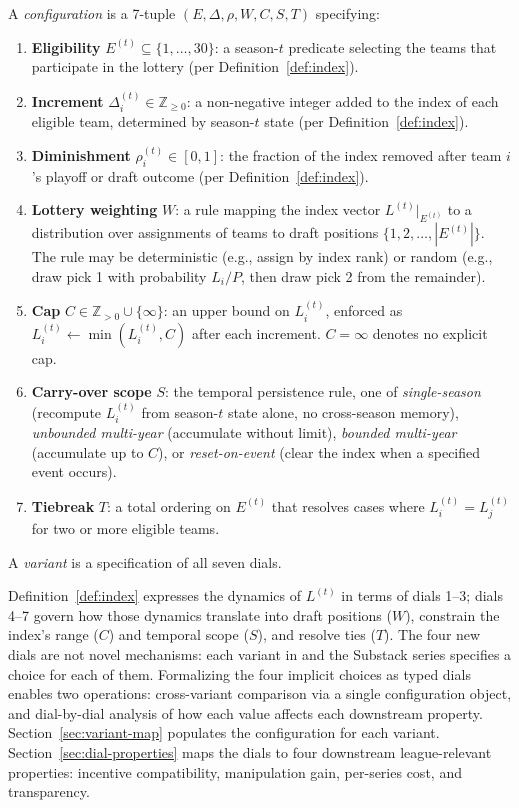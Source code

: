 \begin{definition}
\label{def:configuration}
A \cola{} \emph{configuration} is a 7-tuple $(E, \Delta, \rho, W, C, S, T)$ specifying:
\begin{enumerate}
    \item \textbf{Eligibility} $E^{(t)} \subseteq \{1, \ldots, 30\}$: a season-$t$ predicate selecting the teams that participate in the lottery (per Definition~\ref{def:index}).
    \item \textbf{Increment} $\Delta_i^{(t)} \in \mathbb{Z}_{\geq 0}$: a non-negative integer added to the index of each eligible team, determined by season-$t$ state (per Definition~\ref{def:index}).
    \item \textbf{Diminishment} $\rho_i^{(t)} \in [0, 1]$: the fraction of the index removed after team $i$'s playoff or draft outcome (per Definition~\ref{def:index}).
    \item \textbf{Lottery weighting} $W$: a rule mapping the index vector $L^{(t)}|_{E^{(t)}}$ to a distribution over assignments of teams to draft positions $\{1, 2, \ldots, |E^{(t)}|\}$. The rule may be deterministic (e.g., assign by index rank) or random (e.g., draw pick 1 with probability $L_i / P$, then draw pick 2 from the remainder).
    \item \textbf{Cap} $C \in \mathbb{Z}_{>0} \cup \{\infty\}$: an upper bound on $L_i^{(t)}$, enforced as $L_i^{(t)} \leftarrow \min(L_i^{(t)}, C)$ after each increment. $C = \infty$ denotes no explicit cap.
    \item \textbf{Carry-over scope} $S$: the temporal persistence rule, one of \emph{single-season} (recompute $L_i^{(t)}$ from season-$t$ state alone, no cross-season memory), \emph{unbounded multi-year} (accumulate without limit), \emph{bounded multi-year} (accumulate up to $C$), or \emph{reset-on-event} (clear the index when a specified event occurs).
    \item \textbf{Tiebreak} $T$: a total ordering on $E^{(t)}$ that resolves cases where $L_i^{(t)} = L_j^{(t)}$ for two or more eligible teams.
\end{enumerate}
A \cola{} \emph{variant} is a specification of all seven dials.
\end{definition}

Definition~\ref{def:index} expresses the dynamics of $L^{(t)}$ in terms of dials 1--3; dials 4--7 govern how those dynamics translate into draft positions ($W$), constrain the index's range ($C$) and temporal scope ($S$), and resolve ties ($T$). The four new dials are not novel mechanisms: each variant in \citet{highley2026cola} and the Substack series specifies a choice for each of them. Formalizing the four implicit choices as typed dials enables two operations: cross-variant comparison via a single configuration object, and dial-by-dial analysis of how each value affects each downstream property. Section~\ref{sec:variant-map} populates the configuration for each variant. Section~\ref{sec:dial-properties} maps the dials to four downstream league-relevant properties: incentive compatibility, manipulation gain, per-series cost, and transparency.

